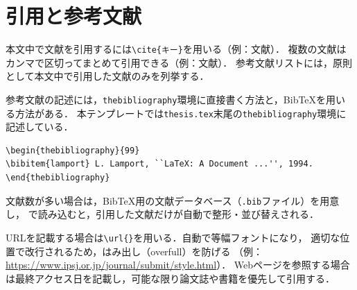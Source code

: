 \section{引用と参考文献}
\label{sec:reference}
本文中で文献を引用するには\verb|\cite{キー}|を用いる（例：文献\cite{lamport}）．
複数の文献はカンマで区切ってまとめて引用できる（例：文献\cite{tex,kisaragi,companion}）．
参考文献リストには，原則として本文中で引用した文献のみを列挙する．

参考文献の記述には，\texttt{thebibliography}環境に直接書く方法と，BibTeXを用いる方法がある．
本テンプレートでは\texttt{thesis.tex}末尾の\texttt{thebibliography}環境に記述している．

\begin{lstlisting}[language={[LaTeX]TeX}, numbers=none, frame=single]
\begin{thebibliography}{99}
\bibitem{lamport} L. Lamport, ``LaTeX: A Document ...'', 1994.
\end{thebibliography}
\end{lstlisting}

文献数が多い場合は，BibTeX用の文献データベース（\texttt{.bib}ファイル）を用意し，
\verb||で読み込むと，引用した文献だけが自動で整形・並び替えされる．

URLを記載する場合は\verb|\url{}|を用いる．自動で等幅フォントになり，
適切な位置で改行されるため，はみ出し（overfull）を防げる
（例：\url{https://www.ipsj.or.jp/journal/submit/style.html}）．
Webページを参照する場合は最終アクセス日を記載し，可能な限り論文誌や書籍を優先して引用する．
